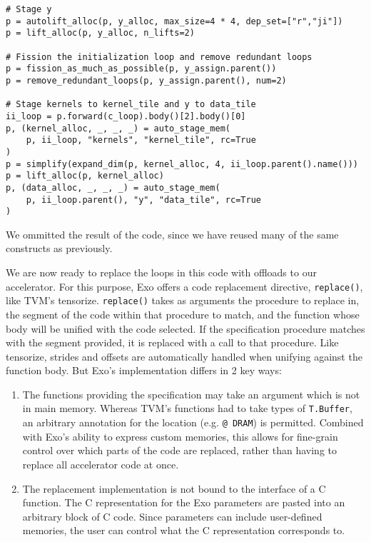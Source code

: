 \documentclass[acmsmall, nonacm=true]{acmart}
\begin{document}
\begin{verbatim}
# Stage y
p = autolift_alloc(p, y_alloc, max_size=4 * 4, dep_set=["r","ji"])
p = lift_alloc(p, y_alloc, n_lifts=2)

# Fission the initialization loop and remove redundant loops
p = fission_as_much_as_possible(p, y_assign.parent())
p = remove_redundant_loops(p, y_assign.parent(), num=2)

# Stage kernels to kernel_tile and y to data_tile
ii_loop = p.forward(c_loop).body()[2].body()[0]
p, (kernel_alloc, _, _, _) = auto_stage_mem(
    p, ii_loop, "kernels", "kernel_tile", rc=True
)
p = simplify(expand_dim(p, kernel_alloc, 4, ii_loop.parent().name()))
p = lift_alloc(p, kernel_alloc)
p, (data_alloc, _, _, _) = auto_stage_mem(
    p, ii_loop.parent(), "y", "data_tile", rc=True
)
\end{verbatim}

We ommitted the result of the code, since we have reused many of the same constructs as previously.

We are now ready to replace the loops in this code with offloads to our accelerator. For this purpose, Exo offers a code replacement directive, \verb|replace()|, like TVM's tensorize. \verb|replace()| takes as arguments the procedure to replace in, the segment of the code within that procedure to match, and the function whose body will be unified with the code selected.  If the specification procedure matches with the segment provided, it is replaced with a call to that procedure. Like tensorize, strides and offsets are automatically handled when unifying against the function body. But Exo's implementation differs in 2 key ways:
\begin{enumerate}
    \item The functions providing the specification may take an argument which is not in main memory. Whereas TVM's functions had to take types of \verb|T.Buffer|, an arbitrary annotation for the location (e.g. \verb|@ DRAM|) is permitted. Combined with Exo's ability to express custom memories, this allows for fine-grain control over which parts of the code are replaced, rather than having to replace all accelerator code at once. 
    \item The replacement implementation is not bound to the interface of a C function. The C representation for the Exo parameters are pasted into an arbitrary block of C code. Since parameters can include user-defined memories, the user can control what the C representation corresponds to.
\end{enumerate}
\end{document}
